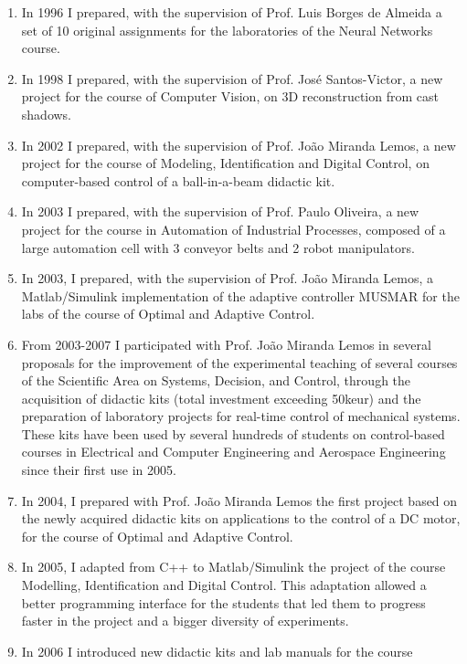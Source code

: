 \documentclass[
]{article}
\begin{document}
\begin{enumerate}
\def\labelenumi{\arabic{enumi}.}
\item
  In 1996 I prepared, with the supervision of Prof. Luis Borges de
  Almeida a set of 10 original assignments for the laboratories of the
  Neural Networks course.
\item
  In 1998 I prepared, with the supervision of Prof. José Santos-Victor,
  a new project for the course of Computer Vision, on 3D reconstruction
  from cast shadows.
\item
  In 2002 I prepared, with the supervision of Prof. João Miranda Lemos,
  a new project for the course of Modeling, Identification and Digital
  Control, on computer-based control of a ball-in-a-beam didactic kit.
\item
  In 2003 I prepared, with the supervision of Prof. Paulo Oliveira, a
  new project for the course in Automation of Industrial Processes,
  composed of a large automation cell with 3 conveyor belts and 2 robot
  manipulators.
\item
  In 2003, I prepared, with the supervision of Prof. João Miranda Lemos,
  a Matlab/Simulink implementation of the adaptive controller MUSMAR for
  the labs of the course of Optimal and Adaptive Control.
\item
  From 2003-2007 I participated with Prof. João Miranda Lemos in several
  proposals for the improvement of the experimental teaching of several
  courses of the Scientific Area on Systems, Decision, and Control,
  through the acquisition of didactic kits (total investment exceeding
  50keur) and the preparation of laboratory projects for real-time
  control of mechanical systems. These kits have been used by several
  hundreds of students on control-based courses in Electrical and
  Computer Engineering and Aerospace Engineering since their first use
  in 2005.
\item
  In 2004, I prepared with Prof. João Miranda Lemos the first project
  based on the newly acquired didactic kits on applications to the
  control of a DC motor, for the course of Optimal and Adaptive Control.
\item
  In 2005, I adapted from C++ to Matlab/Simulink the project of the
  course Modelling, Identification and Digital Control. This adaptation
  allowed a better programming interface for the students that led them
  to progress faster in the project and a bigger diversity of
  experiments.
\item
  In 2006 I introduced new didactic kits and lab manuals for the course

\end{enumerate}
\end{document}

